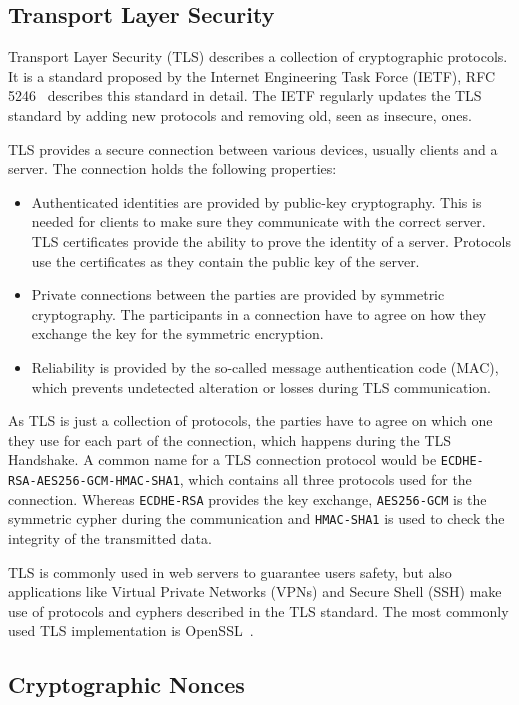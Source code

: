 \subsection{Transport Layer Security}

Transport Layer Security (TLS) describes a collection of cryptographic
protocols. It is a standard proposed by the Internet Engineering Task Force
(IETF), RFC 5246~\cite{rfc5246} describes this standard in detail. The IETF
regularly updates the TLS standard by adding new protocols and removing old,
seen as insecure, ones.

TLS provides a secure connection between various devices, usually clients and a
server. The connection holds the following properties:
\begin{itemize}
  \item Authenticated identities are provided by public-key cryptography. This
is needed for clients to make sure they communicate with the correct server. TLS
certificates provide the ability to prove the identity of a server. Protocols
use the certificates as they contain the public key of the server.
  \item Private connections between the parties are provided by symmetric
cryptography. The participants in a connection have to agree on how they
exchange the key for the symmetric encryption.
  \item Reliability is provided by the so-called message authentication code
(MAC), which prevents undetected alteration or losses during TLS communication.
\end{itemize}

As TLS is just a collection of protocols, the parties have to agree on which one
they use for each part of the connection, which happens during the TLS
Handshake. A common name for a TLS connection protocol would be
\texttt{ECDHE-RSA-AES256-GCM-HMAC-SHA1}, which contains all three protocols used
for the connection. Whereas \texttt{ECDHE-RSA} provides the key exchange,
\texttt{AES256-GCM} is the  symmetric cypher during the communication and
\texttt{HMAC-SHA1} is used to check the integrity of the transmitted data.

TLS is commonly used in web servers to guarantee user\textquotesingle s safety,
but also applications like Virtual Private Networks (VPNs) and Secure Shell
(SSH) make use of protocols and cyphers described in the TLS standard. The most
commonly used TLS implementation is OpenSSL~\cite{opensslweb}.

\subsection{Cryptographic Nonces}

